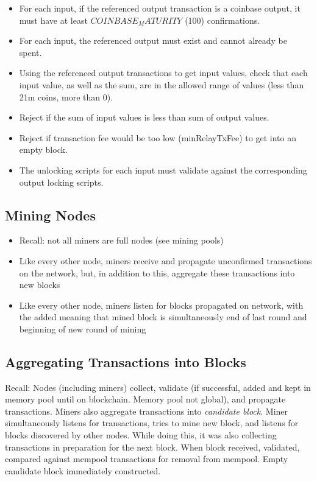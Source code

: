 \documentclass[english, 11pt]{article}
\begin{document}
\begin{itemize}
    \item For each input, if the referenced output transaction is a coinbase output, it must have at least $COINBASE_MATURITY$ (100) confirmations.
    \item For each input, the referenced output must exist and cannot already be spent.
    \item Using the referenced output transactions to get input values, check that each input value, as well as the sum, are in the allowed range of values (less than 21m coins, more than 0).
    \item Reject if the sum of input values is less than sum of output values.
    \item Reject if transaction fee would be too low (minRelayTxFee) to get into an empty block.
    \item The unlocking scripts for each input must validate against the corresponding output locking scripts.
\end{itemize}

\subsection{Mining Nodes}
\begin{itemize}
    \item Recall: not all miners are full nodes (see mining pools)
    \item Like every other node, miners receive and propagate unconfirmed transactions on the network, but, in addition to this, aggregate these transactions into new blocks
    \item Like every other node, miners listen for blocks propagated on network, with the added meaning that mined block is simultaneously end of last round and beginning of new round of mining 
\end{itemize}

\subsection{Aggregating Transactions into Blocks}
\noindent Recall: Nodes (including miners) collect, validate (if successful, added and kept in memory pool until on blockchain. Memory pool not global), and propagate transactions. Miners also aggregate transactions into \textit{candidate block}. Miner simultaneously listens for transactions, tries to mine new block, and listens for blocks discovered by other nodes. While doing this, it was also collecting transactions in preparation for the next block. When block received, validated, compared against mempool transactions for removal from mempool. Empty candidate block immediately constructed. 
\end{document}
